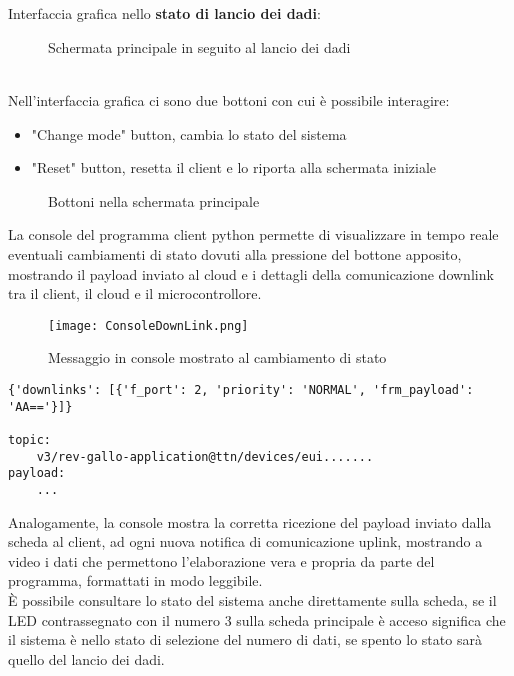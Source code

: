\\\\Interfaccia grafica nello \textbf{stato di lancio dei dadi}:
\begin{figure}[h!]
    \centering
    \caption{Schermata principale in seguito al lancio dei dadi}
    \label{fig:RollStateON}
\end{figure}
\\Nell'interfaccia grafica ci sono due bottoni con cui è possibile interagire:
\begin{itemize}
    \item "Change mode" button, cambia lo stato del sistema
    \item "Reset" button, resetta il client e lo riporta alla schermata iniziale
\end{itemize}
\begin{figure}[h!]
    \centering
    \caption{Bottoni nella schermata principale}
    \label{fig:HomePageButtons}
\end{figure}

La console del programma client python permette di visualizzare in tempo reale eventuali cambiamenti di stato dovuti alla pressione del bottone apposito, 
mostrando il payload inviato al cloud e i dettagli della comunicazione downlink tra il client, il cloud e il microcontrollore.

\begin{figure}[h!]  %
    \centering
    \texttt{[image: ConsoleDownLink.png]}
    \caption{Messaggio in console mostrato al cambiamento di stato}
    \label{fig:ConsoleDownLink}
\end{figure}
\begin{verbatim}
{'downlinks': [{'f_port': 2, 'priority': 'NORMAL', 'frm_payload': 'AA=='}]}

topic:
    v3/rev-gallo-application@ttn/devices/eui.......
payload:
    ...
\end{verbatim}

Analogamente, la console mostra la corretta ricezione del payload inviato dalla scheda al client, ad ogni nuova notifica di comunicazione uplink, 
mostrando a video i dati che permettono l'elaborazione vera e propria da parte del programma, formattati in modo leggibile.\\


È possibile consultare lo stato del sistema anche direttamente sulla scheda, se il LED contrassegnato con il numero 3 sulla scheda principale 
è acceso significa che il sistema è nello stato di selezione del numero di dati, se spento lo stato sarà quello del lancio dei dadi. %












